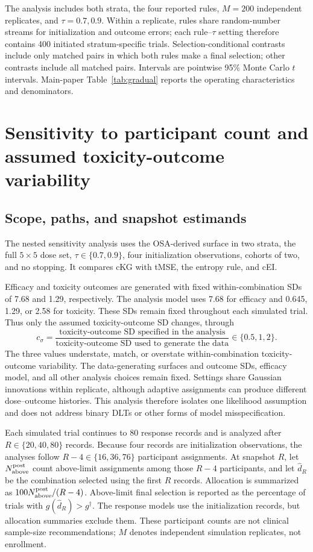 \documentclass[11pt]{article}
\newcommand{\rev}[1]{{#1}}
\begin{document}
The analysis includes both strata, the four reported rules, $M=200$ independent replicates, and $\tau=0.7,0.9$. Within a replicate, rules share random-number streams for initialization and outcome errors; each rule--$\tau$ setting therefore contains 400 initiated stratum-specific trials. Selection-conditional contrasts include only matched pairs in which both rules make a final selection; other contrasts include all matched pairs. Intervals are pointwise 95\% Monte Carlo $t$ intervals. Main-paper Table~\ref{tab:gradual} reports the operating characteristics and denominators.

\section{Sensitivity to participant count and assumed toxicity-outcome variability}\label{sec:noiserobust}

\subsection{Scope, paths, and snapshot estimands}

The nested sensitivity analysis uses the OSA-derived surface in two strata, the full $5\times5$ dose set, $\tau\in\{0.7,0.9\}$, four \rev{initialization observations}, cohorts of two, and no stopping. It compares cKG with tMSE, the entropy rule, and cEI.

Efficacy and toxicity outcomes are generated with fixed within-combination SDs of 7.68 and 1.29, respectively. The analysis model uses 7.68 for efficacy and 0.645, 1.29, or 2.58 for toxicity. \rev{These SDs remain fixed throughout each simulated trial.} Thus only the assumed toxicity-outcome SD changes, through
\[
c_\sigma=\frac{\text{toxicity-outcome SD specified in the analysis}}
{\text{toxicity-outcome SD used to generate the data}}\in\{0.5,1,2\}.
\]
The three values understate, match, or overstate within-combination toxicity-outcome variability. The data-generating surfaces and outcome SDs, efficacy model, and all other analysis choices remain fixed. Settings share Gaussian innovations within replicate, although adaptive assignments can produce different dose--outcome histories. This analysis therefore isolates one likelihood assumption and does not address binary DLTs or other forms of model misspecification.

Each simulated trial continues to 80 response records and is analyzed after $R\in\{20,40,80\}$ records. Because four records are \rev{initialization observations}, the analyses follow $R-4\in\{16,36,76\}$ participant assignments. \rev{At snapshot $R$, let $N_{\rm above}^{\rm post}$ count above-limit assignments among those $R-4$ participants, and let $\hat d_R$ be the combination selected using the first $R$ records. Allocation is summarized as $100N_{\rm above}^{\rm post}/(R-4)$. Above-limit final selection is reported as the percentage of trials with $g(\hat d_R)>g^\dagger$.}
\rev{The response models use the initialization records, but allocation summaries exclude them.} These participant counts are not clinical sample-size recommendations; $M$ denotes independent simulation replicates, not enrollment.
\end{document}
